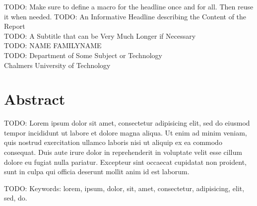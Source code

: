 TODO: Make sure to define a macro for the headline once and for all. Then reuse it when needed.
TODO: An Informative Headline describing the Content of the Report\\
TODO: A Subtitle that can be Very Much Longer if Necessary\\
TODO: NAME FAMILYNAME\\
TODO: Department of Some Subject or Technology\\
Chalmers University of Technology \setlength{\parskip}{0.5cm}

\thispagestyle{plain}			%
\section*{Abstract}
TODO: Lorem ipsum dolor sit amet, consectetur adipisicing elit, sed do eiusmod tempor incididunt ut labore et dolore magna aliqua. Ut enim ad minim veniam, quis nostrud exercitation ullamco laboris nisi ut aliquip ex ea commodo consequat. Duis aute irure dolor in reprehenderit in voluptate velit esse cillum dolore eu fugiat nulla pariatur. Excepteur sint occaecat cupidatat non proident, sunt in culpa qui officia deserunt mollit anim id est laborum.

\vfill
TODO: Keywords: lorem, ipsum, dolor, sit, amet, consectetur, adipisicing, elit, sed, do.

\newpage				%
\thispagestyle{empty}
\mbox{}

